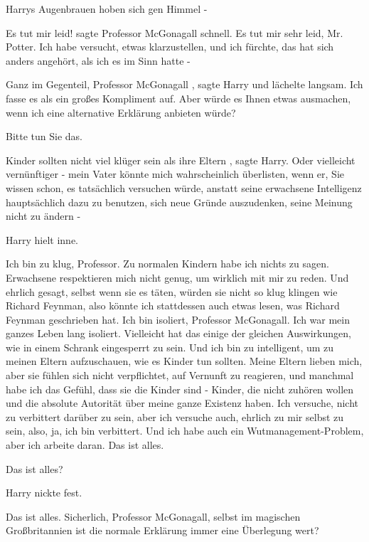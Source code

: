 Harrys Augenbrauen hoben sich gen Himmel -

\glqq Es tut mir leid!\grqq{} sagte Professor McGonagall schnell. \glqq Es tut
mir sehr leid, Mr. Potter. Ich habe versucht, etwas klarzustellen, und ich
fürchte, das hat sich anders angehört, als ich es im Sinn hatte -\grqq{}

\glqq Ganz im Gegenteil, Professor McGonagall\grqq{} , sagte Harry und lächelte
langsam. \glqq Ich fasse es als ein großes Kompliment auf. Aber würde es
Ihnen etwas ausmachen, wenn ich eine alternative Erklärung anbieten
würde?\grqq{}

\glqq Bitte tun Sie das.\grqq{}

\glqq Kinder sollten nicht viel klüger sein als ihre Eltern\grqq{} , sagte
Harry. \glqq Oder vielleicht vernünftiger - mein Vater könnte mich
wahrscheinlich überlisten, wenn er, Sie wissen schon, es tatsächlich
versuchen würde, anstatt seine erwachsene Intelligenz hauptsächlich dazu zu
benutzen, sich neue Gründe auszudenken, seine Meinung nicht zu ändern
-\grqq{}

Harry hielt inne.

\glqq Ich bin zu klug, Professor. Zu normalen Kindern habe ich nichts zu sagen.
Erwachsene respektieren mich nicht genug, um wirklich mit mir zu reden. Und
ehrlich gesagt, selbst wenn sie es täten, würden sie nicht so klug klingen
wie Richard Feynman, also könnte ich stattdessen auch etwas lesen, was
Richard Feynman geschrieben hat. Ich bin isoliert, Professor McGonagall. Ich
war mein ganzes Leben lang isoliert. Vielleicht hat das einige der gleichen
Auswirkungen, wie in einem Schrank eingesperrt zu sein. Und ich bin zu
intelligent, um zu meinen Eltern aufzuschauen, wie es Kinder tun sollten.
Meine Eltern lieben mich, aber sie fühlen sich nicht verpflichtet, auf
Vernunft zu reagieren, und manchmal habe ich das Gefühl, dass sie die Kinder
sind - Kinder, die nicht zuhören wollen und die absolute Autorität über
meine ganze Existenz haben. Ich versuche, nicht zu verbittert darüber zu
sein, aber ich versuche auch, ehrlich zu mir selbst zu sein, also, ja, ich
bin verbittert. Und ich habe auch ein Wutmanagement-Problem, aber ich
arbeite daran. Das ist alles.\grqq{}

\glqq Das ist alles?\grqq{}

Harry nickte fest.

\glqq Das ist alles. Sicherlich, Professor McGonagall, selbst im magischen
Großbritannien ist die normale Erklärung immer eine Überlegung wert?\grqq{}

